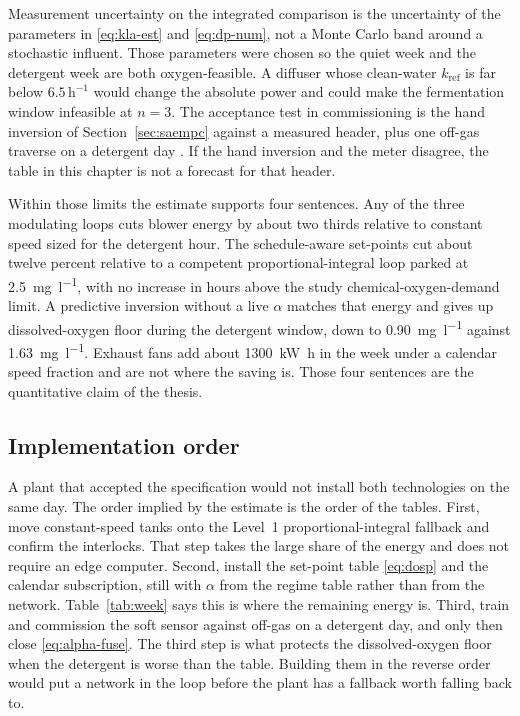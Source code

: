 Measurement uncertainty on the integrated comparison is the uncertainty of the parameters in \eqref{eq:kla-est} and \eqref{eq:dp-num}, not a Monte Carlo band around a stochastic influent. Those parameters were chosen so the quiet week and the detergent week are both oxygen-feasible. A diffuser whose clean-water $k_{\mathrm{ref}}$ is far below $6.5\,\mathrm{h^{-1}}$ would change the absolute power and could make the fermentation window infeasible at $n=3$. The acceptance test in commissioning is the hand inversion of Section~\ref{sec:saempc} against a measured header, plus one off-gas traverse on a detergent day \cite{asce2007oxygen,leu2009,gillot2005}. If the hand inversion and the meter disagree, the table in this chapter is not a forecast for that header.

Within those limits the estimate supports four sentences. Any of the three modulating loops cuts blower energy by about two thirds relative to constant speed sized for the detergent hour. The schedule-aware set-points cut about twelve percent relative to a competent proportional-integral loop parked at \SI{2.5}{\milli\gram\per\litre}, with no increase in hours above the study chemical-oxygen-demand limit. A predictive inversion without a live $\alpha$ matches that energy and gives up dissolved-oxygen floor during the detergent window, down to \SI{0.90}{\milli\gram\per\litre} against \SI{1.63}{\milli\gram\per\litre}. Exhaust fans add about \SI{1300}{\kilo\watt\hour} in the week under a calendar speed fraction and are not where the saving is. Those four sentences are the quantitative claim of the thesis.

\subsection{Implementation order}

A plant that accepted the specification would not install both technologies on the same day. The order implied by the estimate is the order of the tables. First, move constant-speed tanks onto the Level~1 proportional-integral fallback and confirm the interlocks. That step takes the large share of the energy and does not require an edge computer. Second, install the set-point table \eqref{eq:dosp} and the calendar subscription, still with $\alpha$ from the regime table rather than from the network. Table~\ref{tab:week} says this is where the remaining energy is. Third, train and commission the soft sensor against off-gas on a detergent day, and only then close \eqref{eq:alpha-fuse}. The third step is what protects the dissolved-oxygen floor when the detergent is worse than the table. Building them in the reverse order would put a network in the loop before the plant has a fallback worth falling back to.

